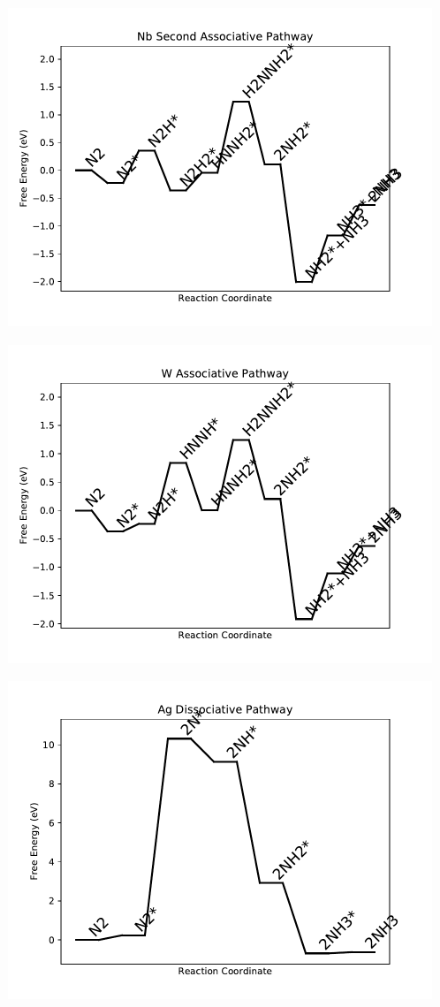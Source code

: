 \begin{figure}
\includegraphics[width=0.8\linewidth]{data/plots/Nb_associative_2.pdf}
\end{figure}

\begin{figure}
\includegraphics[width=0.8\linewidth]{data/plots/W_associative.pdf}
\end{figure}

\begin{figure}
\includegraphics[width=0.8\linewidth]{data/plots/Ag_dissociative.pdf}
\end{figure}

